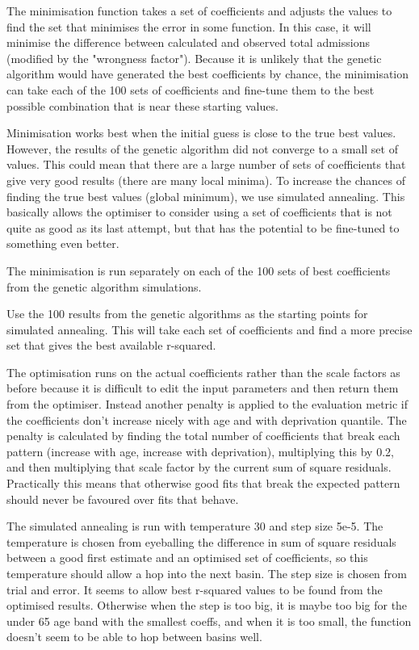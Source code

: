 \documentclass[12pt]{extarticle}
\begin{document}
The minimisation function takes a set of coefficients and adjusts the values to find the set that minimises the error in some function. In this case, it will minimise the difference between calculated and observed total admissions (modified by the "wrongness factor").
Because it is unlikely that the genetic algorithm would have generated the best coefficients by chance, the minimisation can take each of the 100 sets of coefficients and fine-tune them to the best possible combination that is near these starting values.

Minimisation works best when the initial guess is close to the true best values. However, the results of the genetic algorithm did not converge to a small set of values. This could mean that there are a large number of sets of coefficients that give very good results (there are many local minima). To increase the chances of finding the true best values (global minimum), we use simulated annealing. This basically allows the optimiser to consider using a set of coefficients that is not quite as good as its last attempt, but that has the potential to be fine-tuned to something even better.


The minimisation is run separately on each of the 100 sets of best coefficients from the genetic algorithm simulations.

Use the 100 results from the genetic algorithms as the starting points for simulated annealing. This will take each set of coefficients and find a more precise set that gives the best available r-squared.

The optimisation runs on the actual coefficients rather than the scale factors as before because it is difficult to edit the input parameters and then return them from the optimiser. Instead another penalty is applied to the evaluation metric if the coefficients don't increase nicely with age and with deprivation quantile. The penalty is calculated by finding the total number of coefficients that break each pattern (increase with age, increase with deprivation), multiplying this by 0.2, and then multiplying that scale factor by the current sum of square residuals.
Practically this means that otherwise good fits that break the expected pattern should never be favoured over fits that behave.


The simulated annealing is run with temperature 30 and step size 5e-5.
The temperature is chosen from eyeballing the difference in sum of square residuals between a good first estimate and an optimised set of coefficients, so this temperature should allow a hop into the next basin.
The step size is chosen from trial and error. It seems to allow best r-squared values to be found from the optimised results. Otherwise when the step is too big, it is maybe too big for the under 65 age band with the smallest coeffs, and when it is too small, the function doesn't seem to be able to hop between basins well.
\end{document}
